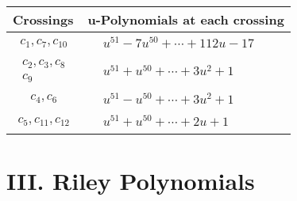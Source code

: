 \documentclass[1p]{elsarticle_modified}
\theoremstyle{definition}
\begin{document}
\begin{tabular}{m{50pt}|m{274pt}}
Crossings & \hspace{64pt}u-Polynomials at each crossing \\
\hline $$\begin{aligned}c_{1},c_{7},c_{10}\end{aligned}$$&$\begin{aligned}
&u^{51}-7 u^{50}+\cdots+112 u-17
\end{aligned}$\\
\hline $$\begin{aligned}c_{2},c_{3},c_{8}\\c_{9}\end{aligned}$$&$\begin{aligned}
&u^{51}+u^{50}+\cdots+3 u^2+1
\end{aligned}$\\
\hline $$\begin{aligned}c_{4},c_{6}\end{aligned}$$&$\begin{aligned}
&u^{51}- u^{50}+\cdots+3 u^2+1
\end{aligned}$\\
\hline $$\begin{aligned}c_{5},c_{11},c_{12}\end{aligned}$$&$\begin{aligned}
&u^{51}+u^{50}+\cdots+2 u+1
\end{aligned}$\\
\hline
\end{tabular}\newpage\renewcommand{\arraystretch}{1}
\centering \section*{ III. Riley Polynomials}
\end{document}
